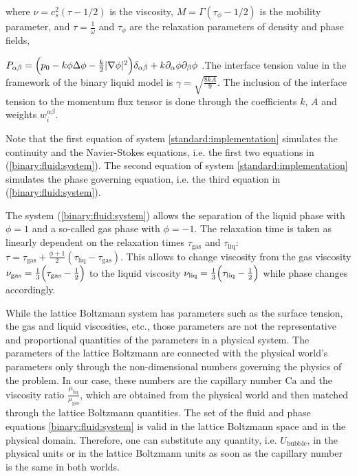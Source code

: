 \documentclass[preprint,12pt]{elsarticle}
\newcommand{\Ca}{\mathrm{Ca}}
\begin{document}
where $\nu=c_s^2 (\tau-1/2)$ is the viscosity,
$M=\Gamma(\tau_{\phi}-1/2)$ is the mobility parameter, and $\tau=\frac{1}{\omega}$ and $\tau_{\phi}$
are the relaxation parameters of density and phase fields, {\color{red}
$P_{\alpha\beta}=\Bigl(p_0-k\phi \Delta \phi -\frac{k}{2}|\nabla \phi|^2\Bigr)\delta_{\alpha\beta}
+ k \partial_{\alpha} \phi \partial_{\beta} \phi$  \cite{pooley-contact}.The interface tension value
in the framework of the binary liquid model is $\gamma=\sqrt{\frac{8 k
A}{9}}$. The inclusion of the interface tension to the momentum flux tensor is done through the
coefficients $k$, $A$ and weights $w_i^{\alpha\beta}$.

Note that the first equation of system \ref{standard:implementation} simulates the continuity and
the Navier-Stokes equations, i.e. the first two equations in (\ref{binary:fluid:system}). The second
equation
of system \ref{standard:implementation} simulates the phase governing equation, i.e. the third
equation in
(\ref{binary:fluid:system}).} The system (\ref{binary:fluid:system}) allows the separation of the
liquid
phase with $\phi=1$ and a so-called gas phase with $\phi=-1$. The
relaxation time is taken as linearly dependent on the relaxation
times $\tau_{\mathrm{gas}}$ and $\tau_{\mathrm{liq}}$:
$\tau=\tau_{\mathrm{gas}}+\frac{\phi+1}{2}(\tau_{\mathrm{liq}}-\tau_{\mathrm{gas}})$. This allows
to change viscosity from the gas viscosity
$\nu_{\mathrm{gas}}=\frac{1}{3}\Bigl(\tau_{\mathrm{gas}}-\frac{1}{2}\Bigr)$ to the liquid viscosity
$\nu_{\mathrm{liq}}=\frac{1}{3}\Bigl(\tau_{\mathrm{liq}}-\frac{1}{2}\Bigr)$ while phase changes
accordingly.

{\color{red}
While the lattice Boltzmann system has parameters such as the surface tension, the gas and liquid
viscosities, etc., those parameters are not the representative and
proportional quantities of the parameters in a physical system. The parameters of the lattice
Boltzmann are connected with the physical world's parameters only through the non-dimensional
numbers governing the physics of the problem. In our case, these numbers are the capillary number $\Ca$ and the
viscosity ratio $\frac{\mu_{\mathrm{liq}}}{\mu_{\mathrm{gas}}}$, which are
obtained from the physical world and then matched through the lattice Boltzmann quantities.
 The set of
the fluid and phase equations \eqref{binary:fluid:system} is valid in the lattice Boltzmann space
and in the physical domain. Therefore, one can substitute any quantity, i.e.
$U_{\mathrm{bubble}}$, in the physical units or in the lattice Boltzmann units as soon as the
capillary number is the same in both worlds.} 
\end{document}
